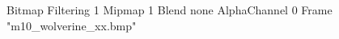 {Bitmap
	{Filtering 1}
	{Mipmap 1}
	{Blend none}
	{AlphaChannel 0}
	{Frame "m10_wolverine_xx.bmp"}
}
